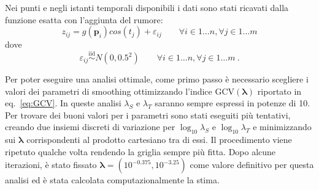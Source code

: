 \documentclass[a4paper,11pt,twoside,openright]{book}							%
\begin{document}
Nei punti e negli istanti temporali disponibili i dati sono stati ricavati dalla funzione esatta con l'aggiunta del rumore:
$$
z_{ij}=g(\bm p_{i})cos(t_j) + \varepsilon_{ij} \qquad \forall i \in 1\ldots n, \forall j \in 1\ldots m
$$
dove
$$
\varepsilon_{ij}\stackrel{\mathrm{iid}}{\sim}N(0,0.5^2) \qquad \forall i \in 1\ldots n, \forall j \in 1\ldots m \ .
$$

Per poter eseguire una analisi ottimale, come primo passo è necessario scegliere i valori dei parametri di smoothing ottimizzando l'indice $\mathrm{GCV}(\bm \lambda)$ riportato in eq.~\ref{eq:GCV}. In queste analisi $\lambda_S$ e $\lambda_T$ saranno sempre espressi in potenze di 10. Per trovare dei buoni valori per i parametri sono stati eseguiti più tentativi, creando due insiemi discreti di variazione per $\log_{10}\lambda_S$ e $\log_{10}\lambda_T$ e minimizzando sui $\bm \lambda$ corrispondenti al prodotto cartesiano tra di essi. Il procedimento viene ripetuto qualche volta rendendo la griglia sempre più fitta. Dopo alcune iterazioni, è stato fissato $\bm \lambda = (10^{-0.375}, 10^{-3.25})$ come valore definitivo per questa analisi ed è stata calcolata computazionalmente la stima.
\end{document}
